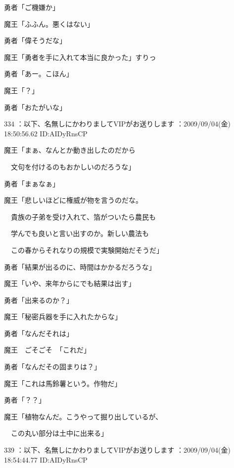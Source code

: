 \documentclass[a4j,twocolumn]{tarticle}
\begin{document}
勇者「ご機嫌か」\par{} 
魔王「ふふん。悪くはない」\par{} 
勇者「偉そうだな」 



魔王「勇者を手に入れて本当に良かった」すりっ\par{} 
勇者「あー。こほん」\par{} 
魔王「？」\par{} 
勇者「おたがいな」 

	
    
    

334 ：以下、名無しにかわりましてVIPがお送りします ：2009/09/04(金) 18:50:56.62 ID:AIDyRnsCP 


魔王「まぁ、なんとか動き出したのだから\par{} 
　文句を付けるのもおかしいのだろうな」 



勇者「まぁなぁ」 



魔王「悲しいほどに権威が物を言うのだな。\par{} 
　貴族の子弟を受け入れて、箔がついたら農民も\par{} 
　学んでも良いと言い出すのか。新しい農法も\par{} 
　この春からそれなりの規模で実験開始だそうだ」 



勇者「結果が出るのに、時間はかかるだろうな」 



魔王「いや、来年からにでも結果は出す」\par{} 
勇者「出来るのか？」 



魔王「秘密兵器を手に入れたからな」\par{} 
勇者「なんだそれは」 



魔王　ごそごそ　「これだ」\par{} 
勇者「なんだその固まりは？」 



魔王「これは馬鈴薯という。作物だ」\par{} 
勇者「？？」\par{} 
魔王「植物なんだ。こうやって掘り出しているが、\par{} 
　この丸い部分は土中に出来る」 

	
    
    

339 ：以下、名無しにかわりましてVIPがお送りします ：2009/09/04(金) 18:54:44.77 ID:AIDyRnsCP 
\end{document}
